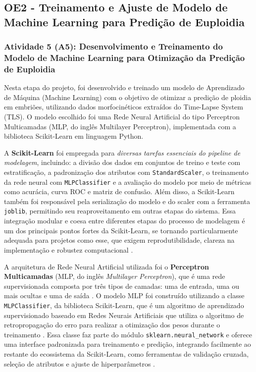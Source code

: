 \subsection{OE2 - Treinamento e Ajuste de Modelo de Machine Learning para Predição de Euploidia}
\subsubsection{Atividade 5 (A5): Desenvolvimento e Treinamento do Modelo de Machine Learning para Otimização da Predição de Euploidia}
Nesta etapa do projeto, foi desenvolvido e treinado um modelo de Aprendizado de Máquina (Machine Learning) com o objetivo de otimizar a predição de ploidia em embriões, utilizando dados morfocinéticos extraídos do Time-Lapse System (TLS). O modelo escolhido foi uma Rede Neural Artificial do tipo Perceptron Multicamadas (MLP, do inglês Multilayer Perceptron), implementada com a biblioteca Scikit-Learn em linguagem Python.

A \textbf{Scikit-Learn} foi empregada para \textit{diversas tarefas essenciais do pipeline de modelagem}, incluindo: a divisão dos dados em conjuntos de treino e teste com estratificação, a padronização dos atributos com \texttt{StandardScaler}, o treinamento da rede neural com \texttt{MLPClassifier} e a avaliação do modelo por meio de métricas como acurácia, curva ROC e matriz de confusão. Além disso, a Scikit-Learn também foi responsável pela serialização do modelo e do scaler com a ferramenta \texttt{joblib}, permitindo seu reaproveitamento em outras etapas do sistema. Essa integração modular e coesa entre diferentes etapas do processo de modelagem é um dos principais pontos fortes da Scikit-Learn, se tornando particularmente adequada para projetos como esse, que exigem reprodutibilidade, clareza na implementação e robustez computacional \cite{geron2017}.

A arquitetura de Rede Neural Artificial utilizada foi o \textbf{Perceptron Multicamadas} (MLP, do inglês \textit{Multilayer Perceptron}), que é uma rede supervisionada composta por três tipos de camadas: uma de entrada, uma ou mais ocultas e uma de saída \cite{haykin2001}. O modelo MLP foi construído utilizando a classe \texttt{MLPClassifier}, da biblioteca Scikit-Learn, que é um algoritmo de aprendizado supervisionado baseado em Redes Neurais Artificiais que utiliza o algoritmo de retropropagação do erro para realizar a otimização dos pesos durante o treinamento \cite{geron2017}.  Essa classe faz parte do módulo \texttt{sklearn.neural\_network} e oferece uma interface padronizada para treinamento e predição, integrando facilmente ao restante do ecossistema da Scikit-Learn, como ferramentas de validação cruzada, seleção de atributos e ajuste de hiperparâmetros \cite{scikit-learn}. 

